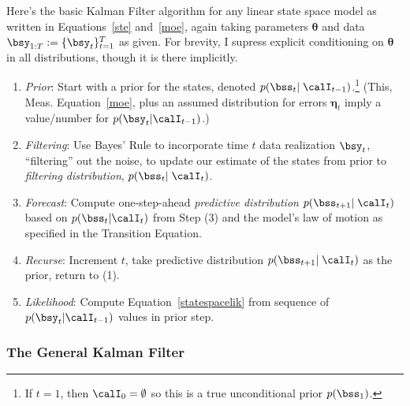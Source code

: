 \documentclass[12pt]{article}
\theoremstyle{plain}
\theoremstyle{definition}
\theoremstyle{remark}
\newcommand{\bseta}{\boldsymbol{\eta}}
\newcommand{\bstheta}{\boldsymbol{\theta}}
\begin{document}
Here's the basic Kalman Filter algorithm for any linear state
space model as written in Equations~\ref{ste} and~\ref{moe}, again
taking parameters $\bstheta$ and data $\bsy_{1:T}:=\{\bsy_t\}_{t=1}^T$
as given. For brevity, I supress explicit conditioning on $\bstheta$ in
all distributions, though it is there implicitly.
\begin{enumerate}
\item
  \emph{Prior}:
  Start with a prior for the states, denoted $p(\bss_t |\;
  \calI_{t-1})$.\footnote{%
    If $t=1$, then $\calI_0=\emptyset$ so this is a true unconditional
    prior $p(\bss_1)$.
  }
  (This, Meas. Equation~\ref{moe}, plus an assumed distribution for
  errors $\bseta_t$ imply a value/number for $p(\bsy_t|\calI_{t-1})$.)

\item
  \emph{Filtering}:
  Use Bayes' Rule to incorporate time $t$ data realization $\bsy_t$,
  ``filtering'' out the noise, to update our estimate of the states from
  prior to \emph{filtering distribution}, $p(\bss_t |\; \calI_{t})$.

\item
  \emph{Forecast}:
  Compute one-step-ahead \emph{predictive distribution}
  $p(\bss_{t+1} | \; \calI_{t})$ based on $p(\bss_t|\calI_t)$
  from Step (3) and the model's law of motion as specified in the
  Transition Equation.

\item \emph{Recurse}: Increment $t$, take predictive distribution
  $p(\bss_{t+1} |\; \calI_{t})$ as the prior, return to (1).

\item \emph{Likelihood}:
  Compute Equation~\ref{statespacelik} from sequence of
  $p(\bsy_t|\calI_{t-1})$ values in prior step.
\end{enumerate}


\subsubsection{The General Kalman Filter}
\label{subsec:kfdetails}
\end{document}

